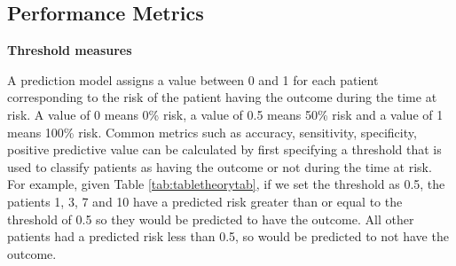 \documentclass[11pt]{book}
\theoremstyle{definition}
\theoremstyle{definition}
\theoremstyle{definition}
\theoremstyle{remark}
\begin{document}
\hypertarget{performance}{%
\subsection{Performance Metrics}\label{performance}}

\textbf{Threshold measures}

A prediction model assigns a value between 0 and 1 for each patient corresponding to the risk of the patient having the outcome during the time at risk. A value of 0 means 0\% risk, a value of 0.5 means 50\% risk and a value of 1 means 100\% risk. Common metrics such as accuracy, sensitivity, specificity, positive predictive value can be calculated by first specifying a threshold that is used to classify patients as having the outcome or not during the time at risk. For example, given Table \ref{tab:tabletheorytab}, if we set the threshold as 0.5, the patients 1, 3, 7 and 10 have a predicted risk greater than or equal to the threshold of 0.5 so they would be predicted to have the outcome. All other patients had a predicted risk less than 0.5, so would be predicted to not have the outcome.     
\end{document}
